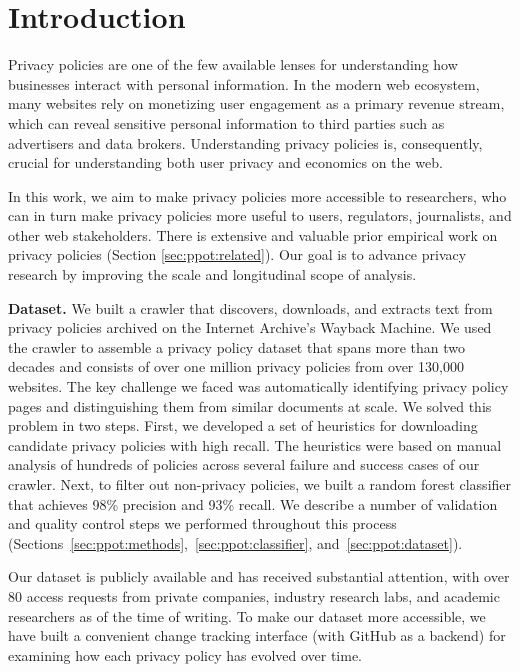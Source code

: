 \section{Introduction}
\label{sec:ppot:intro}
Privacy policies are one of the few available lenses for understanding how businesses interact with personal information. In the modern web ecosystem, many websites rely on monetizing user engagement as a primary revenue stream, which can reveal sensitive personal information to third parties such as advertisers and data brokers. Understanding privacy policies is, consequently, crucial for understanding both user privacy and economics on the web.

In this work, we aim to make privacy policies more accessible to researchers, who can in turn make privacy policies more useful to users, regulators, journalists, and other web stakeholders. There is extensive and valuable prior empirical work on privacy policies (Section \ref{sec:ppot:related}). Our goal is to advance privacy research by improving the scale and longitudinal scope of analysis.

\textbf{Dataset.} We built a crawler that discovers, downloads, and extracts text from privacy policies archived on the Internet Archive’s Wayback Machine. We used the crawler to assemble a privacy policy dataset that spans more than two decades and consists of over one million privacy policies from over 130,000 websites. The key challenge we faced was automatically identifying privacy policy pages and distinguishing them from similar documents at scale. We solved this problem in two steps. First, we developed a set of heuristics for downloading candidate privacy policies with high recall. The heuristics were based on manual analysis of hundreds of policies across several failure and success cases of our crawler. Next, to filter out non-privacy policies, we built a random forest classifier that achieves 98\% precision and 93\% recall. We describe a number of validation and quality control steps we performed throughout this process (Sections~\ref{sec:ppot:methods},~\ref{sec:ppot:classifier}, and~\ref{sec:ppot:dataset}).

Our dataset is publicly available and has received substantial attention, with over 80 access requests from private companies, industry research labs, and academic researchers as of the time of writing. 
To make our dataset more accessible, we have built a convenient change tracking interface (with GitHub as a backend) for examining how each privacy policy has evolved over time.

